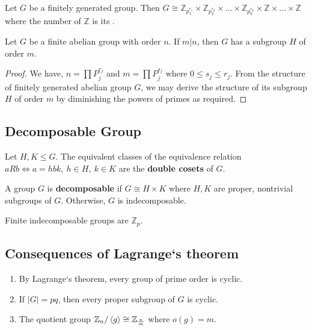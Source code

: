 \begin{theorem}
	Let $G$ be a finitely generated group.
	Then $G \cong \mathbb{Z}_{p_1^{r_1}} \times \mathbb{Z}_{p_2^{r_2}} \times \dots \times \mathbb{Z}_{p_k^{r_k}} \times \mathbb{Z} \times \dots \times \mathbb{Z}$ where the number of $\mathbb{Z}$ is its .
\end{theorem}

\begin{theorem}
	Let $G$ be a finite abelian group with order $n$. If $m|n$, then $G$ has a subgroup $H$ of order $m$.
\end{theorem}
\begin{proof}
	We have, $n = \prod P_j^{r_j}$ and $m = \prod P_j^{s_j}$ where $0 \le s_j \le r_j$.
	From the structure of finitely generated abelian group $G$, we may derive the structure of its subgroup $H$ of order $m$ by diminishing the powers of primes as required.
\end{proof}

\subsection{Decomposable Group}
\begin{definition}
	Let $H,K \le G$.
	The equivalent classes of the equivalence relation $aRb \iff a = hbk,\ h \in H,\ k \in K$ are the \textbf{double cosets} of $G$.
\end{definition}

\begin{definition}
	A group $G$ is \textbf{decomposable} if $G \cong H \times K$ where $H,K$ are proper, nontrivial subgroups of $G$.
	Otherwise, $G$ is indecomposable.
\end{definition}
	Finite indecomposable groups are $\mathbb{Z}_p$.

\subsection{Consequences of Lagrange`s theorem}
\begin{enumerate}
	\item By Lagrange`s theorem, every group of prime order is cyclic.
	\item If $|G|=pq$, then every proper subgroup of $G$ is cyclic.
	\item The quotient group $\mathbb{Z}_n/\left\langle g \right\rangle \cong \mathbb{Z}_\frac{n}{m}$ where $o(g)=m$.
\end{enumerate}

